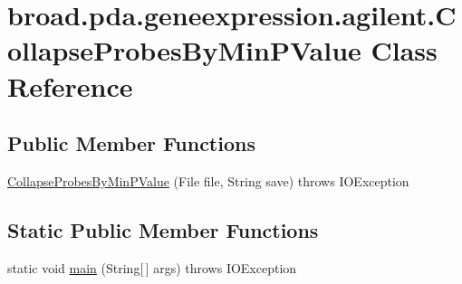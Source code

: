 \hypertarget{classbroad_1_1pda_1_1geneexpression_1_1agilent_1_1_collapse_probes_by_min_p_value}{\section{broad.\+pda.\+geneexpression.\+agilent.\+Collapse\+Probes\+By\+Min\+P\+Value Class Reference}
\label{classbroad_1_1pda_1_1geneexpression_1_1agilent_1_1_collapse_probes_by_min_p_value}
}
\subsection*{Public Member Functions}
\begin{DoxyCompactItemize}
\item 
\hyperlink{classbroad_1_1pda_1_1geneexpression_1_1agilent_1_1_collapse_probes_by_min_p_value_af33b2c853b3c87797106c98b06473036}{Collapse\+Probes\+By\+Min\+P\+Value} (File file, String save)  throws I\+O\+Exception
\end{DoxyCompactItemize}
\subsection*{Static Public Member Functions}
\begin{DoxyCompactItemize}
\item 
static void \hyperlink{classbroad_1_1pda_1_1geneexpression_1_1agilent_1_1_collapse_probes_by_min_p_value_a2097b70bfb5c1764f7b303d9bf566b55}{main} (String\mbox{[}$\,$\mbox{]} args)  throws I\+O\+Exception
\end{DoxyCompactItemize}


